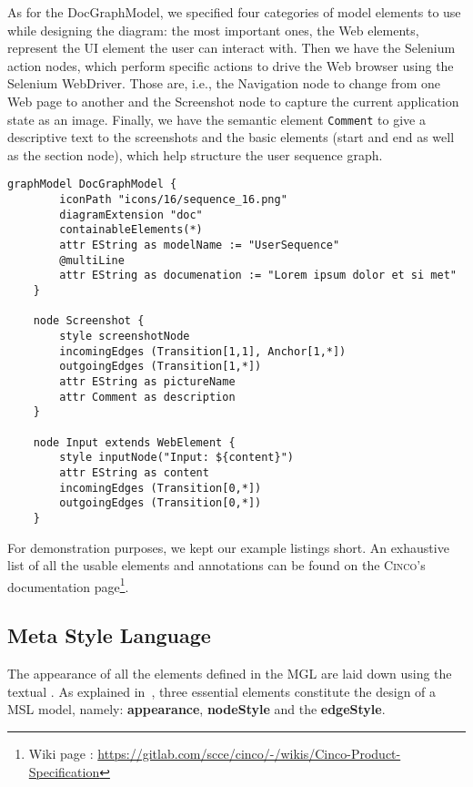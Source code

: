 As for the DocGraphModel, we specified four categories of model elements to use while designing the diagram: the most important ones, the Web elements, represent the UI element the user can interact with. Then we have the Selenium action nodes, which perform specific actions to drive the Web browser using the Selenium WebDriver. Those are, i.e., the Navigation node to change from one Web page to another and the Screenshot node to capture the current application state as an image. Finally, we have the semantic element \lstinline{Comment} to give a descriptive text to the screenshots and the basic elements (start and end as well as the section node), which help structure the user sequence graph.

\begin{lstlisting}[language=MGL, caption={Excerpt from the Doc.mgl, meta-specification of the DocGraphModel}, label=featMGL, escapechar=|]
    graphModel DocGraphModel {
        iconPath "icons/16/sequence_16.png"
        diagramExtension "doc"
        containableElements(*)
        attr EString as modelName := "UserSequence"
        @multiLine
        attr EString as documenation := "Lorem ipsum dolor et si met"
    }
    
    node Screenshot {
        style screenshotNode
        incomingEdges (Transition[1,1], Anchor[1,*])
        outgoingEdges (Transition[1,*])
        attr EString as pictureName
        attr Comment as description
    }

    node Input extends WebElement {
        style inputNode("Input: ${content}")
        attr EString as content
        incomingEdges (Transition[0,*])
        outgoingEdges (Transition[0,*])
    }
\end{lstlisting}

For demonstration purposes, we kept our example listings short. An exhaustive list of all the usable elements and annotations can be found on the \textsc{Cinco}'s documentation page\footnote[1]{Wiki page : \url{https://gitlab.com/scce/cinco/-/wikis/Cinco-Product-Specification}}.

\subsection{Meta Style Language}\label{sec:MSL}

The appearance of all the elements defined in the MGL are laid down using the textual . As explained in~\cite{gitlabcinco}, three essential elements constitute the design of a MSL model, namely: \textbf{appearance}, \textbf{nodeStyle} and the \textbf{edgeStyle}.

